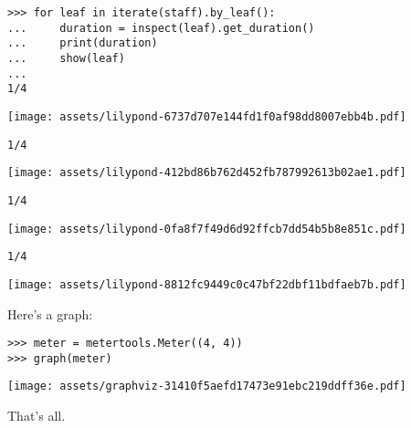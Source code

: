 \documentclass{article}
\begin{document}
\begin{lstlisting}
>>> for leaf in iterate(staff).by_leaf():
...     duration = inspect(leaf).get_duration()
...     print(duration)
...     show(leaf)
...
1/4
\end{lstlisting}
\noindent\texttt{[image: assets/lilypond-6737d707e144fd1f0af98dd8007ebb4b.pdf]}
\begin{lstlisting}
1/4
\end{lstlisting}
\noindent\texttt{[image: assets/lilypond-412bd86b762d452fb787992613b02ae1.pdf]}
\begin{lstlisting}
1/4
\end{lstlisting}
\noindent\texttt{[image: assets/lilypond-0fa8f7f49d6d92ffcb7dd54b5b8e851c.pdf]}
\begin{lstlisting}
1/4
\end{lstlisting}
\noindent\texttt{[image: assets/lilypond-8812fc9449c0c47bf22dbf11bdfaeb7b.pdf]}

Here's a graph:

\begin{comment}
<abjad>
meter = metertools.Meter((4, 4))
graph(meter)
</abjad>
\end{comment}

\begin{lstlisting}
>>> meter = metertools.Meter((4, 4))
>>> graph(meter)
\end{lstlisting}
\noindent\texttt{[image: assets/graphviz-31410f5aefd17473e91ebc219ddff36e.pdf]}

That's all.
\end{document}
